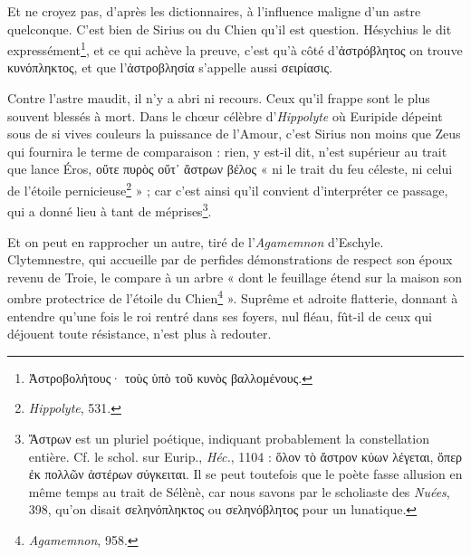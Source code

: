 \documentclass{book}%
\newcommand{\italique}[1]{\textit{#1}}%
\newcommand{\note}[1]{\footnote{#1}}
\begin{document}
Et ne croyez pas, d'après les dictionnaires, à l'influence maligne d'un astre quelconque. C'est bien de Sirius ou du Chien qu'il est question. Hésychius le dit expressément\note{Ἀστροβολήτους· τοὺς ὑπὸ τοῦ κυνὸς βαλλομένους.}, et ce qui achève la preuve, c'est qu'à côté d'ἀστρόβλητος on trouve κυνόπληκτος, et que l'ἀστροβλησία s'appelle aussi σειρίασις. 

Contre l'astre maudit, il n'y a abri ni recours. Ceux qu'il frappe sont le plus souvent blessés à mort. Dans le chœur célèbre d'\italique{Hippolyte} où Euripide dépeint sous de si vives couleurs la puissance de l'Amour, c'est Sirius non moins que Zeus qui fournira le terme de comparaison : rien, y est-il dit, n'est supérieur au trait que lance Éros, οὔτε πυρὸς οὔτ᾽ ἄστρων βέλος « ni le trait du feu céleste, ni celui de l'étoile pernicieuse\note{\italique{Hippolyte}, 531.} » ; car c'est ainsi qu'il convient d'interpréter ce passage, qui a donné lieu à tant de méprises\note{Ἄστρων est un pluriel poétique, indiquant probablement la constellation entière. Cf. le schol. sur Eurip., \italique{Héc.}, 1104 : ὅλον τὸ ἄστρον κύων λέγεται, ὅπερ ἐκ πολλῶν ἀστέρων σύγκειται. Il se peut toutefois que le poète fasse allusion en même temps au trait de Sélènè, car nous savons par le scholiaste des \italique{Nuées}, 398, qu'on disait σεληνόπληκτος ou σεληνόβλητος pour un lunatique.}. 

Et on peut en rapprocher un autre, tiré de l'\italique{Agamemnon} d'Eschyle. Clytemnestre, qui accueille par de perfides démonstrations de respect son époux revenu de Troie, le compare à un arbre « dont le feuillage étend sur la maison son ombre protectrice de l'étoile du Chien\note{\italique{Agamemnon}, 958.} ». Suprême et adroite flatterie, donnant à entendre qu'une fois le roi rentré dans ses foyers, nul fléau, fût-il de ceux qui déjouent toute résistance, n'est plus à redouter. 
\end{document}
